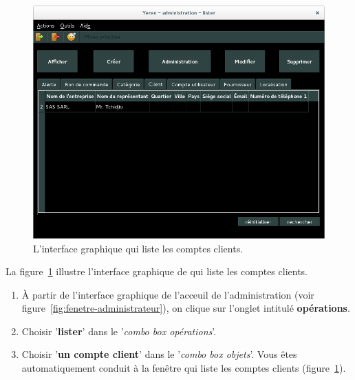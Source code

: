 \begin{figure}[!htpb]
	\centering
	\includegraphics[scale=0.45]{images/compte-client-lister.png}
	\caption{L'interface graphique qui liste les comptes clients.}
	\label{fig:admin-comptes-clients-lister}
\end{figure}

La figure~\ref{fig:admin-comptes-clients-lister} illustre
l'interface graphique de \yeren qui liste les comptes clients.

\begin{enumerate}[1)]
	\item \`A partir de l'interface graphique de l'acceuil de
		l'administration (voir figure~\ref{fig:fenetre-administrateur}),
		on clique sur l'onglet intitul\'e \textbf{op\'erations}. 
		
	\item Choisir '\textbf{lister}' dans le '\emph{combo box
		op\'erations}'.
		
	\item Choisir '\textbf{un compte client}' dans
		le '\emph{combo box objets}'. Vous \^etes automatiquement
		conduit \`a la fen\^etre qui liste les comptes clients
		(figure~\ref{fig:admin-comptes-clients-lister}).
\end{enumerate}


\newpage
{}

